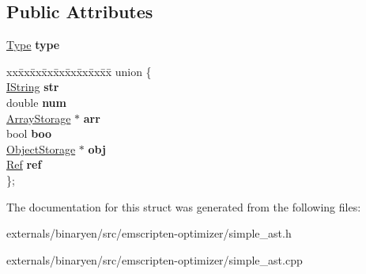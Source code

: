 \subsection*{Public Attributes}
\begin{DoxyCompactItemize}
\item 
\mbox{\label{structcashew_1_1_value_ab943770e8bf1832afee488851819d7cc}} 
\mbox{\hyperlink{struct_type}{Type}} {\bfseries type}
\item 
\mbox{\label{structcashew_1_1_value_a8c9398745d7190cba8e19ed064bc0886}} 
\begin{tabbing}
xx\=xx\=xx\=xx\=xx\=xx\=xx\=xx\=xx\=\kill
union \{\\
\>\mbox{\hyperlink{structcashew_1_1_i_string}{IString}} {\bfseries str}\\
\>double {\bfseries num}\\
\>\mbox{\hyperlink{classcashew_1_1_array_storage}{ArrayStorage}} $\ast$ {\bfseries arr}\\
\>bool {\bfseries boo}\\
\>\mbox{\hyperlink{classstd_1_1unordered__map}{ObjectStorage}} $\ast$ {\bfseries obj}\\
\>\mbox{\hyperlink{structcashew_1_1_ref}{Ref}} {\bfseries ref}\\
\}; \\

\end{tabbing}\end{DoxyCompactItemize}


The documentation for this struct was generated from the following files\+:\begin{DoxyCompactItemize}
\item 
externals/binaryen/src/emscripten-\/optimizer/simple\+\_\+ast.\+h\item 
externals/binaryen/src/emscripten-\/optimizer/simple\+\_\+ast.\+cpp\end{DoxyCompactItemize}
